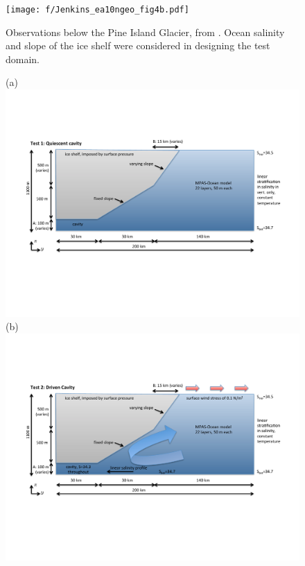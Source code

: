 \documentclass[11pt]{report}
\begin{document}
\begin{figure}[tbh]
\center
\texttt{[image: f/Jenkins\_ea10ngeo\_fig4b.pdf]}
\caption{Observations below the Pine Island Glacier, from \citet{Jenkins_ea10ngeo}.  Ocean salinity and slope of the ice shelf were considered in designing the test domain.}
\label{figure:pig observations}
\end{figure}

\begin{figure}[tbh]
\center
(a)\includegraphics[width=5.75in]{f/sub-ice_shelf_test1.pdf}\\
\vspace{.2in}
(b)\includegraphics[width=5.75in]{f/sub-ice_shelf_test2.pdf}\\

\end{figure}
\end{document}
